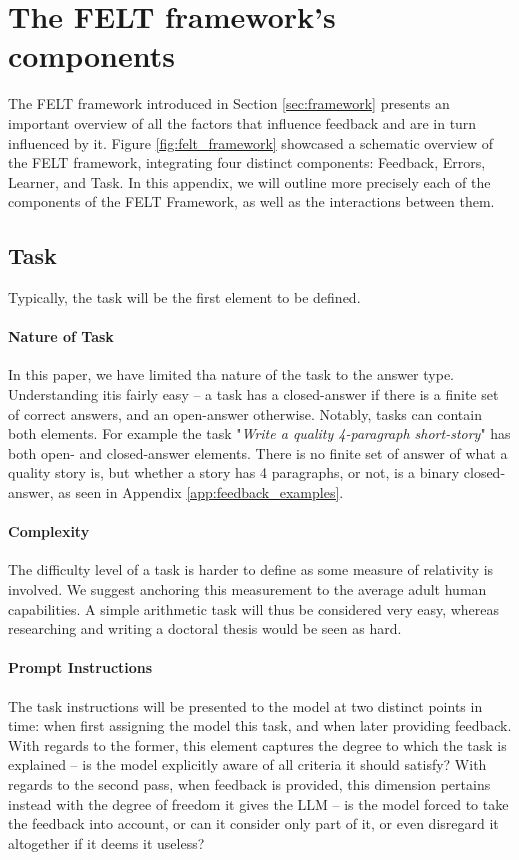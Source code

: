 \section{The FELT framework's components}
\label{app:felt_interactions}

The FELT framework introduced in Section \ref{sec:framework} presents an important overview of all the factors that influence feedback and are in turn influenced by it. Figure \ref{fig:felt_framework} showcased a schematic overview of the FELT framework, integrating four distinct components: Feedback, Errors, Learner, and Task. In this appendix, we will outline more precisely each of the components of the FELT Framework, as well as the interactions between them.

\subsection{Task}
Typically, the task will be the first element to be defined. 

\paragraph{Nature of Task} In this paper, we have limited tha nature of the task to the answer type. Understanding itis fairly easy -- a task has a closed-answer if there is a finite set of correct answers, and an open-answer otherwise. Notably, tasks can contain both elements. For example the task "\textit{Write a quality 4-paragraph short-story}" has both open- and closed-answer elements. There is no finite set of answer of what a quality story is, but whether a story has 4 paragraphs, or not, is a binary closed-answer, as seen in Appendix \ref{app:feedback_examples}.

\paragraph{Complexity} The difficulty level of a task is harder to define as some measure of relativity is involved. We suggest anchoring this measurement to the average adult human capabilities. A simple arithmetic task will thus be considered very easy, whereas researching and writing a doctoral thesis would be seen as hard.

\paragraph{Prompt Instructions} The task instructions will be presented to the model at two distinct points in time: when first assigning the model this task, and when later providing feedback. With regards to the former, this element captures the degree to which the task is explained -- is the model explicitly aware of all criteria it should satisfy? With regards to the second pass, when feedback is provided, this dimension pertains instead with the degree of freedom it gives the LLM -- is the model forced to take the feedback into account, or can it consider only part of it, or even disregard it altogether if it deems it useless?

